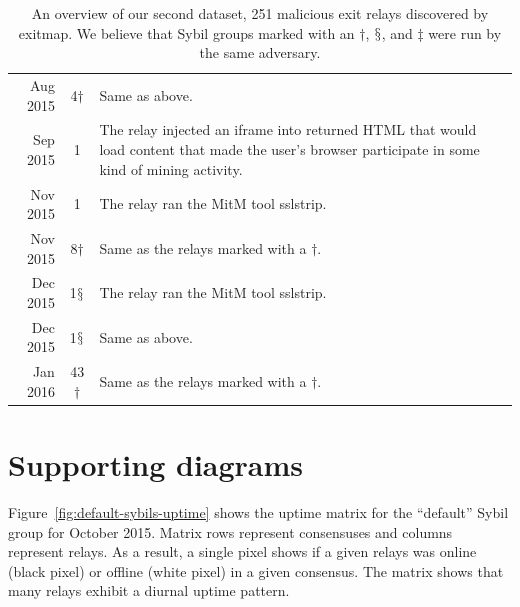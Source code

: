 \begin{table}
\begin{tabularx}{\textwidth}{r c X}
Aug 2015 & 4$\dagger$ & Same as above. \\

Sep 2015 & 1 & The relay injected an iframe into returned HTML that would load
content that made the user's browser participate in some kind of mining
activity. \\

Nov 2015 & 1 & The relay ran the MitM tool sslstrip. \\

Nov 2015 & 8$\dagger$ & Same as the relays marked with a $\dagger$. \\

Dec 2015 & 1$\mathsection$ & The relay ran the MitM tool sslstrip. \\

Dec 2015 & 1$\mathsection$ & Same as above. \\

Jan 2016 & 43$\dagger$ & Same as the relays marked with a $\dagger$. \\
\hline
\end{tabularx}
\caption{An overview of our second dataset, 251 malicious exit relays discovered
by exitmap.  We believe that Sybil groups marked with an $\dagger$,
$\mathsection$, and $\ddagger$ were run by the same adversary.}
\label{tab:exitmap-dataset}
\end{table}

\section{Supporting diagrams}
Figure~\ref{fig:default-sybils-uptime} shows the uptime matrix for the
``default'' Sybil group for October 2015.  Matrix rows represent consensuses and
columns represent relays.  As a result, a single pixel shows if a given relays
was online (black pixel) or offline (white pixel) in a given consensus.  The
matrix shows that many relays exhibit a diurnal uptime pattern.

